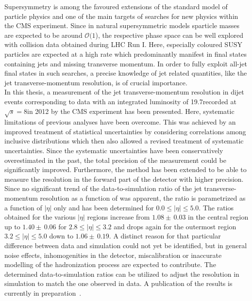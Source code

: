 Supersymmetry is among the favoured extensions of the standard model of particle physics and one of the main targets of searches for new physics within the CMS experiment. Since in natural supersymmetric models sparticle masses are expected to be around $\mathcal{O}(1$\tev), the respective phase space can be well explored with \pp collision data obtained during LHC Run I. Here, especially coloured SUSY particles are expected at a high rate which predominantly manifest in final states containing jets and missing transverse momentum. In order to fully exploit all-jet final states in such searches, a precise knowledge of jet related quantities, like the jet transverse-momentum resolution, is of crucial importance. \\
In this thesis, a measurement of the jet transverse-momentum resolution in dijet events corresponding to data with an integrated luminosity of 19.7\fbinv recorded at $\sqrt{s}=8$\tev in 2012 by the CMS experiment has been presented. Here, systematic limitations of previous analyses have been overcome. This was achieved by an improved treatment of statistical uncertainties by considering correlations among inclusive distributions which then also allowed a revised treatment of systematic uncertainties. Since the systematic uncertainties have been conservatively overestimated in the past, the total precision of the measurement could be significantly improved. Furthermore, the method has been extended to be able to measure the resolution in the forward part of the detector with higher precision. Since no significant trend of the data-to-simulation ratio of the jet transverse-momentum resolution as a function of \ptave was apparent, the ratio is parametrized as a function of $|\eta|$ only and has been determined for $0.0 \leq |\eta| \leq 5.0$. The ratios obtained for the various $|\eta|$ regions increase from $1.08\pm \, 0.03$ in the central region up to $1.40\pm \, 0.06$ for $2.8 \leq |\eta| \leq 3.2$ and drops again for the outermost region $3.2 \leq |\eta| \leq 5.0$ down to $1.06\pm \, 0.19$. A distinct reason for that particular difference between data and simulation could not yet be identified, but in general noise effects, inhomogenities in the detector, miscalibration or inaccurate modelling of the hadronization process are expected to contribute. The determined data-to-simulation ratios can be utilized to adjust the resolution in simulation to match the one observed in data. A publication of the results is currently in preparation~\cite{CMS-JME-13-004}. \\                             
